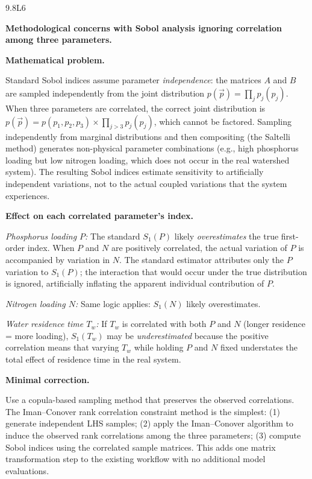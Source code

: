 \begin{solution}{9.8}{L6}

\solanswer

\textbf{Methodological concerns with Sobol analysis ignoring correlation
among three parameters.}

 \textbf{Mathematical problem.}

Standard Sobol indices assume parameter \emph{independence}: the matrices
$A$ and $B$ are sampled independently from the joint distribution $p(\vec{p})
= \prod_j p_j(p_j)$. When three parameters are correlated, the correct
joint distribution is $p(\vec{p}) = p(p_1, p_2, p_3) \times \prod_{j>3} p_j(p_j)$,
which cannot be factored. Sampling independently from marginal distributions
and then compositing (the Saltelli method) generates non-physical parameter
combinations (e.g., high phosphorus loading but low nitrogen loading, which
does not occur in the real watershed system). The resulting Sobol indices
estimate sensitivity to artificially independent variations, not to the
actual coupled variations that the system experiences.

 \textbf{Effect on each correlated parameter's index.}

\textit{Phosphorus loading $P$:} The standard $S_1(P)$ likely \textit{overestimates}
the true first-order index. When $P$ and $N$ are positively correlated,
the actual variation of $P$ is accompanied by variation in $N$. The standard
estimator attributes only the $P$ variation to $S_1(P)$; the interaction
that would occur under the true distribution is ignored, artificially
inflating the apparent individual contribution of $P$.

\textit{Nitrogen loading $N$:} Same logic applies: $S_1(N)$ likely overestimates.

\textit{Water residence time $T_w$:} If $T_w$ is correlated with both $P$ and $N$
(longer residence = more loading), $S_1(T_w)$ may be \textit{underestimated}
because the positive correlation means that varying $T_w$ while holding $P$
and $N$ fixed understates the total effect of residence time in the real system.

 \textbf{Minimal correction.}

Use a copula-based sampling method that preserves the observed correlations.
The Iman--Conover rank correlation constraint method is the simplest:
(1) generate independent LHS samples; (2) apply the Iman--Conover algorithm
to induce the observed rank correlations among the three parameters;
(3) compute Sobol indices using the correlated sample matrices.
This adds one matrix transformation step to the existing workflow with
no additional model evaluations.


\end{solution}
